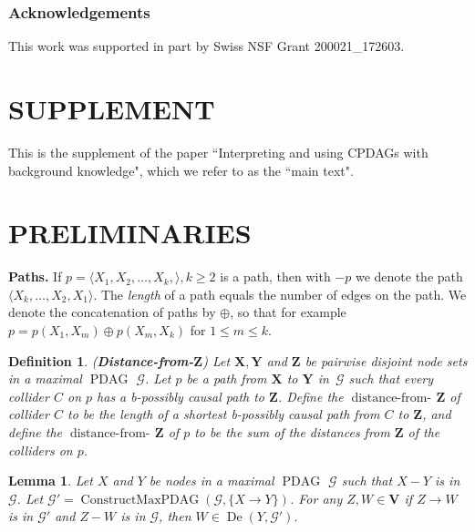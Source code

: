 \documentclass[letterpaper]{article}
\newtheorem{lemma}[theorem]{Lemma}
\newtheorem{definition}[theorem]{Definition}
\theoremstyle{definition}
\theoremstyle{remark}
\DeclareMathOperator{\PDAG}{PDAG}
\DeclareMathOperator{\De}{De}
\DeclareMathOperator{\distancefrom}{distance-from-\!}
\DeclareMathOperator{\ConstructMaxPDAG}{ConstructMaxPDAG}
\newcommand{\mpdag}{maximal $\PDAG$}
\newcommand{\g}[1][G]{\mathcal{#1}}
\begin{document}
\subsubsection*{Acknowledgements}
This work was supported in part by Swiss NSF Grant 200021\_172603.

\newpage
\appendix

\section*{SUPPLEMENT}

This is the supplement of the paper ``Interpreting and using CPDAGs with background knowledge", which we refer to as the ``main text".



\section{PRELIMINARIES} \label{sec1}

\textbf{Paths.} If $p = \langle X_1, X_2, \dots , X_k, \rangle, k \ge 2$ is a path, then with $-p$ we denote the path $\langle X_k, \dots , X_2, X_1 \rangle$. The \textit{length} of a path equals the number of edges on the path. We denote the concatenation of paths by $\oplus$, so that for example $p = p(X_1,X_{m}) \oplus p(X_{m},X_{k})$ for $1 \le m \le k$.

\begin{definition} (\textbf{Distance-from-$\mathbf{Z}$})
Let $\mathbf{X,Y}$ and $\mathbf{Z}$ be pairwise disjoint node sets in a \mpdag{} $\g$. Let $p$ be a path from $\mathbf{X}$ to $\mathbf{Y}$ in~$\g$ such that every collider $C$ on $p$ has a b-possibly causal path to $\mathbf{Z}$. Define the $\distancefrom{\mathbf{Z}}$ of collider $C$ to be the length of a shortest b-possibly causal path from $C$ to $\mathbf{Z}$, and define the $\distancefrom{\mathbf{Z}}$ of $p$ to be the sum of the distances from $\mathbf{Z}$ of the colliders on $p$.
\label{def:distance from Z}
\end{definition}

\begin{lemma} \citep[Lemma~A.7 in][]{ernestroth2016}
Let $X$ and $Y$ be nodes in a  \mpdag{} $\g$ such that $X - Y$ is in $\g$. Let $\g' = \ConstructMaxPDAG(\g,\{X \rightarrow Y\})$. For any $Z,W \in \mathbf{V}$ if $Z \rightarrow W$ is in $\g'$ and $Z -W$ is in $\g$, then $W \in \De(Y,\g')$.
\label{lemma:alwaydesc}
\end{lemma}
\end{document}
